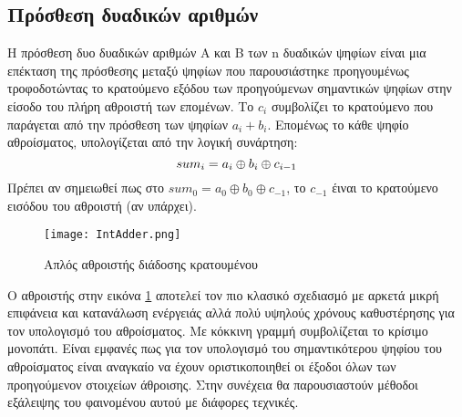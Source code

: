 % 
\subsection{Πρόσθεση δυαδικών αριθμών}

Η πρόσθεση δυο δυαδικών αριθμών A και Β των n δυαδικών ψηφίων είναι 
μια επέκταση της πρόσθεσης μεταξύ ψηφίων που παρουσιάστηκε προηγουμένως τροφοδοτώντας 
το κρατούμενο εξόδου των προηγούμενων σημαντικών ψηφίων στην είσοδο του πλήρη αθροιστή 
των επομένων. Το $c_{i}$ συμβολίζει το κρατούμενο που παράγεται από την πρόσθεση των ψηφίων 
$a_i+b_i$. Επομένως το κάθε ψηφίο αθροίσματος, υπολογίζεται από την 
λογική συνάρτηση:
\begin{equation}
    sum_i = a_i \oplus b_i \oplus c_{i-1}\\
\end{equation}
Πρέπει αν σημειωθεί πως στο $sum_0 = a_0 \oplus b_0 \oplus c_{-1}$, το $c_{-1}$ έιναι το κρατούμενο εισόδου του αθροιστή (αν υπάρχει).
\begin{figure}[H]
    \centering
    \texttt{[image: IntAdder.png]}
    \caption{Απλός αθροιστής διάδοσης κρατουμένου}
    \label{IntegerAdderSchematic}
\end{figure}
Ο αθροιστής στην εικόνα \ref{IntegerAdderSchematic} αποτελεί τον πιο κλασικό σχεδιασμό 
με αρκετά μικρή επιφάνεια και κατανάλωση ενέργειάς αλλά πολύ υψηλούς χρόνους καθυστέρησης 
για τον υπολογισμό του αθροίσματος. Με κόκκινη γραμμή συμβολίζεται το κρίσιμο μονοπάτι. Είναι εμφανές πως για τον υπολογισμό του σημαντικότερου ψηφίου του αθροίσματος είναι αναγκαίο να έχουν οριστικοποιηθεί οι έξοδοι όλων των προηγούμενον στοιχείων άθροισης. Στην συνέχεια θα παρουσιαστούν μέθοδοι εξάλειψης του φαινομένου αυτού με διάφορες τεχνικές.



